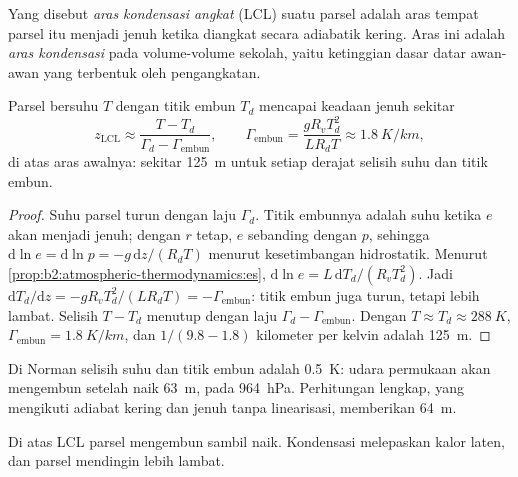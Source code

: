 \begin{definition}\label{def:b2:atmospheric-thermodynamics:lcl}
Yang disebut \emph{aras kondensasi angkat} (LCL) suatu parsel adalah
aras tempat parsel itu menjadi jenuh ketika diangkat secara adiabatik kering. Aras ini adalah
\emph{aras kondensasi} pada volume-volume sekolah, yaitu ketinggian
dasar datar awan-awan yang terbentuk oleh pengangkatan.
\end{definition}

\begin{proposition}\label{prop:b2:atmospheric-thermodynamics:lcl}
Parsel bersuhu $T$ dengan titik embun $T_d$ mencapai keadaan jenuh sekitar
\[
  z_{\text{LCL}} \approx \frac{T - T_d}{\Gamma_d - \Gamma_{\text{embun}}}, \qquad
  \Gamma_{\text{embun}} = \frac{g R_v T_d^2}{L R_d T} \approx \qty{1.8}{K/km},
\]
di atas aras awalnya: sekitar \qty{125}{m} untuk setiap derajat selisih suhu dan titik embun.
\end{proposition}

\begin{proof}
Suhu parsel turun dengan laju $\Gamma_d$. Titik embunnya adalah suhu ketika 
$e$ akan menjadi jenuh; dengan $r$ tetap, $e$ sebanding dengan $p$, sehingga
$\mathrm{d}\ln e = \mathrm{d}\ln p = -g\,\mathrm{d}z/(R_dT)$ menurut kesetimbangan hidrostatik. Menurut
\cref{prop:b2:atmospheric-thermodynamics:es}, $\mathrm{d}\ln e = L\,\mathrm{d}T_d/(R_vT_d^2)$.
Jadi $\mathrm{d}T_d/\mathrm{d}z = -gR_vT_d^2/(LR_dT) = -\Gamma_{\text{embun}}$: titik embun juga turun,
tetapi lebih lambat. Selisih $T - T_d$ menutup dengan laju $\Gamma_d - \Gamma_{\text{embun}}$. Dengan
$T \approx T_d \approx \qty{288}{K}$, $\Gamma_{\text{embun}} = \qty{1.8}{K/km}$, dan $1/(9.8 - 1.8)$
kilometer per kelvin adalah \qty{125}{m}.
\end{proof}

Di Norman selisih suhu dan titik embun adalah \qty{0.5}{K}: udara permukaan akan mengembun setelah
naik \qty{63}{m}, pada \qty{964}{hPa}. Perhitungan lengkap, yang mengikuti adiabat kering dan
 jenuh tanpa linearisasi, memberikan \qty{64}{m}.

Di atas LCL parsel mengembun sambil naik. Kondensasi melepaskan kalor laten, dan parsel
mendingin lebih lambat.

